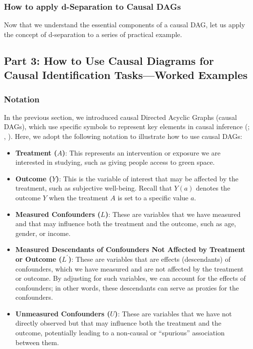 \documentclass[
  singlecolumn]{article}
\providecommand{\tightlist}{%
  \setlength{\itemsep}{0pt}\setlength{\parskip}{0pt}}\usepackage{longtable,booktabs,array}
\begin{document}
\subsubsection{How to apply d-Separation to Causal
DAGs}\label{how-to-apply-d-separation-to-causal-dags}

Now that we understand the essential components of a causal DAG, let us
apply the concept of d-separation to a series of practical example.

\subsection{Part 3: How to Use Causal Diagrams for Causal Identification
Tasks---Worked Examples}\label{section-part3}

\subsubsection{Notation}\label{notation}

In the previous section, we introduced causal Directed Acyclic Graphs
(causal DAGs), which use specific symbols to represent key elements in
causal inference (; ,
). Here, we adopt the following notation
to illustrate how to use causal DAGs:

\begin{itemize}
\tightlist
\item
  \textbf{Treatment (\(A\))}: This represents an intervention or
  exposure we are interested in studying, such as giving people access
  to green space.
\item
  \textbf{Outcome (\(Y\))}: This is the variable of interest that may be
  affected by the treatment, such as subjective well-being. Recall that
  \(Y(a)\) denotes the outcome \(Y\) when the treatment \(A\) is set to
  a specific value \(a\).
\item
  \textbf{Measured Confounders (\(L\))}: These are variables that we
  have measured and that may influence both the treatment and the
  outcome, such as age, gender, or income.
\item
  \textbf{Measured Descendants of Confounders Not Affected by Treatment
  or Outcome (\(L^\prime\))}: These are variables that are effects
  (descendants) of confounders, which we have measured and are not
  affected by the treatment or outcome. By adjusting for such variables,
  we can account for the effects of confounders; in other words, these
  descendants can serve as proxies for the confounders.
\item
  \textbf{Unmeasured Confounders (\(U\))}: These are variables that we
  have not directly observed but that may influence both the treatment
  and the outcome, potentially leading to a non-causal or ``spurious''
  association between them.
\end{itemize}
\end{document}
